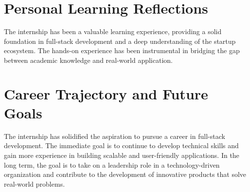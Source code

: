 \section{Personal Learning Reflections}
The internship has been a valuable learning experience, providing a solid foundation in full-stack development and a deep understanding of the startup ecosystem. The hands-on experience has been instrumental in bridging the gap between academic knowledge and real-world application.

\section{Career Trajectory and Future Goals}
The internship has solidified the aspiration to pursue a career in full-stack development. The immediate goal is to continue to develop technical skills and gain more experience in building scalable and user-friendly applications. In the long term, the goal is to take on a leadership role in a technology-driven organization and contribute to the development of innovative products that solve real-world problems.